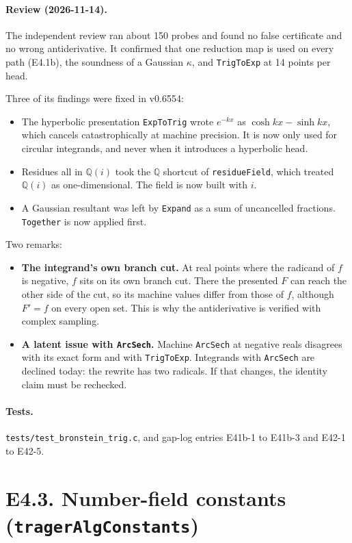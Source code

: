 \documentclass[11pt]{article}
\theoremstyle{definition}
\theoremstyle{remark}
\newcommand{\Q}{\mathbb{Q}}
\newcommand{\code}[1]{\texttt{#1}}
\begin{document}
\paragraph{Review (2026-11-14).} The independent review ran about 150 probes and
found no false certificate and no wrong antiderivative. It confirmed that one
reduction map is used on every path (E4.1b), the soundness of a Gaussian
$\kappa$, and \code{TrigToExp} at 14 points per head.

Three of its findings were fixed in v0.6554:
\begin{itemize}
\item The hyperbolic presentation \code{ExpToTrig} wrote $e^{-kx}$ as
  $\cosh kx-\sinh kx$, which cancels catastrophically at machine precision. It is
  now only used for circular integrands, and never when it introduces a
  hyperbolic head.
\item Residues all in $\Q(i)$ took the $\Q$ shortcut of \code{residueField},
  which treated $\Q(i)$ as one-dimensional. The field is now built with $i$.
\item A Gaussian resultant was left by \code{Expand} as a sum of uncancelled
  fractions. \code{Together} is now applied first.
\end{itemize}

Two remarks:
\begin{itemize}
\item \textbf{The integrand's own branch cut.} At real points where the radicand
  of $f$ is negative, $f$ sits on its own branch cut. There the presented $F$
  can reach the other side of the cut, so its machine values differ from those
  of $f$, although $F'=f$ on every open set. This is why the antiderivative is
  verified with complex sampling.
\item \textbf{A latent issue with \code{ArcSech}.} Machine \code{ArcSech} at
  negative reals disagrees with its exact form and with \code{TrigToExp}.
  Integrands with \code{ArcSech} are declined today: the rewrite has two
  radicals. If that changes, the identity claim must be rechecked.
\end{itemize}

\paragraph{Tests.} \code{tests/test\_bronstein\_trig.c}, and gap-log entries
E41b-1 to E41b-3 and E42-1 to E42-5.

\section*{E4.3. Number-field constants (\code{tragerAlgConstants})}
\end{document}
